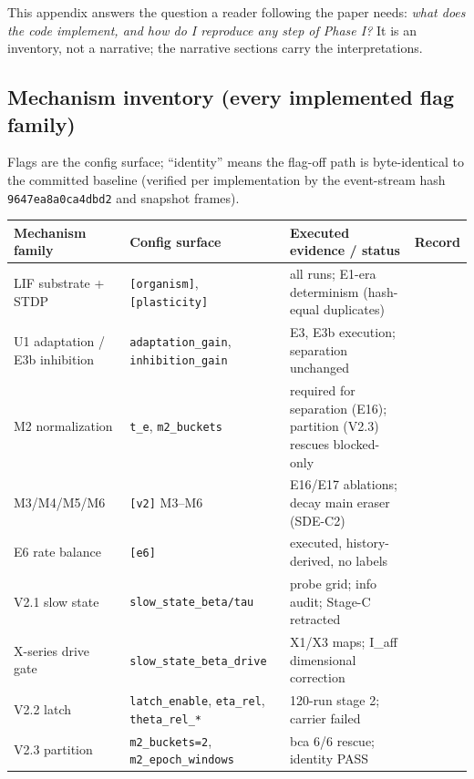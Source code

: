 This appendix answers the question a reader following the paper needs:
\emph{what does the code implement, and how do I reproduce any step of
Phase I?} It is an inventory, not a narrative; the narrative sections
carry the interpretations.

\subsection{Mechanism inventory (every implemented flag family)}

Flags are the config surface; ``identity'' means the flag-off path is
byte-identical to the committed baseline (verified per implementation
by the event-stream hash \texttt{9647ea8a0ca4dbd2} and snapshot
frames).

\begin{center}
\footnotesize
\begin{tabular}{p{3.3cm}p{3.0cm}p{5.2cm}p{3.2cm}}
\toprule
Mechanism family & Config surface & Executed evidence / status & Record \\
\midrule
LIF substrate + STDP & \texttt{[organism]}, \texttt{[plasticity]} & all runs; E1-era determinism (hash-equal duplicates) & \cite{v2proto,e1proto} \\
U1 adaptation / E3b inhibition & \texttt{adaptation\_gain}, \texttt{inhibition\_gain} & E3, E3b execution; separation unchanged & \cite{e3bproto} \\
M2 normalization & \texttt{t\_e}, \texttt{m2\_buckets} & required for separation (E16); partition (V2.3) rescues blocked-only & \cite{synmem,overview} \\
M3/M4/M5/M6 & \texttt{[v2]} M3--M6 & E16/E17 ablations; decay main eraser (SDE-C2) & \cite{synmem,overview} \\
E6 rate balance & \texttt{[e6]} & executed, history-derived, no labels & \cite{v2proto} \\
V2.1 slow state & \texttt{slow\_state\_beta/tau} & probe grid; info audit; Stage-C retracted & \cite{infoaudit} \\
X-series drive gate & \texttt{slow\_state\_beta\_drive} & X1/X3 maps; I\_aff dimensional correction & \cite{xspecdrive,xplorlog,xplor2} \\
V2.2 latch & \texttt{latch\_enable}, \texttt{eta\_rel}, \texttt{theta\_rel\_*} & 120-run stage 2; carrier failed & \cite{overview} \\
V2.3 partition & \texttt{m2\_buckets=2}, \texttt{m2\_epoch\_windows} & bca 6/6 rescue; identity PASS & \cite{overview} \\

\end{tabular}
\end{center}
